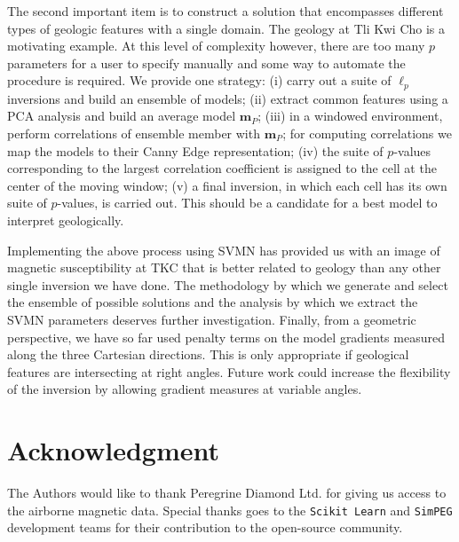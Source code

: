 \documentclass[extra,referee]{gji}
\begin{document}
The second important item is to construct a solution that encompasses different types of geologic features with a single domain. The geology at Tli Kwi Cho is a motivating example. At this level of complexity however, there are too many $p$ parameters for a user to specify manually and some way to automate the procedure is required. We provide one strategy: (i) carry out a suite of $\ell_p$ inversions and build an ensemble of models; (ii) extract common features using a PCA analysis and build an average model $\mathbf{m}_P$; (iii) in a windowed environment, perform correlations of ensemble member with $\mathbf{m}_P$; for computing correlations we map the models to their Canny Edge representation; (iv) the suite of $p$-values corresponding to the largest correlation coefficient is assigned to the cell at the center of the moving window; (v) a final inversion, in which each cell has its own suite of $p$-values, is carried out. This should be a candidate for a best model to interpret geologically.

Implementing the above process using SVMN has provided us with an image of magnetic susceptibility at TKC that is better related to geology than any other single inversion we have done. The methodology by which we generate and select the ensemble of possible solutions and the analysis by which we extract the SVMN parameters deserves further investigation. Finally, from a geometric perspective, we have so far used penalty terms on the model gradients measured along the three Cartesian directions. This is only appropriate if geological features are intersecting at right angles. Future work could increase the flexibility of the inversion by allowing gradient measures at variable angles.



\section{Acknowledgment}
The Authors would like to thank Peregrine Diamond Ltd. for giving us access to the airborne magnetic data. Special thanks goes to the \texttt{Scikit Learn} and \texttt{SimPEG} development teams for their contribution to the open-source community.


\end{document}

